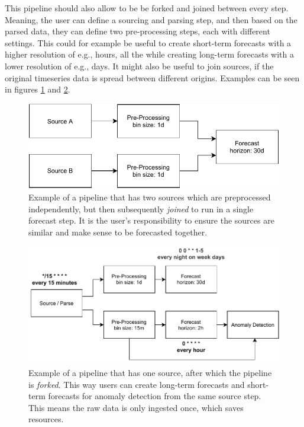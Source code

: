 This pipeline should also allow to be be forked and joined between every step. Meaning, the user can define a sourcing and parsing step, and then based on the parsed data, they can define two pre-processing steps, each with different settings. This could for example be useful to create short-term forecasts with a higher resolution of e.g., hours, all the while creating long-term forecasts with a lower resolution of e.g., days. It might also be useful to join sources, if the original timeseries data is spread between different origins. Examples can be seen in figures \ref{fig:pipeline-join} and \ref{fig:pipeline-fork}.



\begin{figure}
\centerline{\includegraphics[scale=.7]{Figures/pipeline-join.pdf}}
\caption{Example of a pipeline that has two sources which are preprocessed independently, but then subsequently \emph{joined} to run in a single forecast step. It is the user's responsibility to ensure the sources are similar and make sense to be forecasted together.}
\label{fig:pipeline-join}
\end{figure}


\begin{figure}
\centerline{\includegraphics[scale=.7]{Figures/pipeline-fork.pdf}}
\caption{Example of a pipeline that has one source, after which the pipeline is \emph{forked}. This way users can create long-term forecasts and short-term forecasts for anomaly detection from the same source step. This means the raw data is only ingested once, which saves resources.}
\label{fig:pipeline-fork}
\end{figure}

